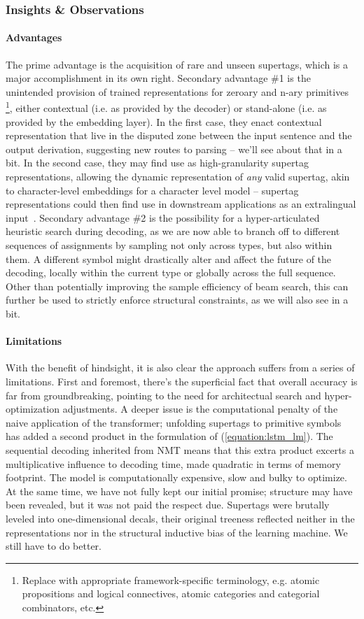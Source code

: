 \subsubsection{Insights \& Observations}
\paragraph{Advantages}
The prime advantage is the acquisition of rare and unseen supertags, which is a major accomplishment in its own right.
Secondary advantage \#1 is the unintended provision of trained representations for zeroary and n-ary primitives%
	\footnote{Replace with appropriate framework-specific terminology, e.g. atomic propositions and logical connectives, atomic categories and categorial combinators, etc.},
either contextual (i.e. as provided by the decoder) or stand-alone (i.e. as provided by the embedding layer).
In the first case, they enact contextual representation that live in the disputed zone between the input sentence and the output derivation, suggesting new routes to parsing -- we'll see about that in a bit.
In the second case, they may find use as high-granularity supertag representations, allowing the dynamic representation of \textit{any} valid supertag, akin to character-level embeddings for a character level model -- supertag representations could then find use in downstream applications as an extralingual input~\cite{kasai-etal-2017-tag}.
Secondary advantage \#2 is the possibility for a hyper-articulated heuristic search during decoding, as we are now able to branch off to different sequences of assignments by sampling not only across types, but also within them.
A different symbol might drastically alter and affect the future of the decoding, locally within the current type or globally across the full sequence.
Other than potentially improving the sample efficiency of beam search, this can further be used to strictly enforce structural constraints, as we will also see in a bit.

\paragraph{Limitations}
With the benefit of hindsight, it is also clear the approach suffers from a series of limitations.
First and foremost, there's the superficial fact that overall accuracy is far from groundbreaking, pointing to the need for architectual search and hyper-optimization adjustments.
A deeper issue is the computational penalty of the naive application of the transformer; unfolding supertags to primitive symbols has added a second product in the formulation of (\ref{equation:lstm_lm}).
The sequential decoding inherited from NMT means that this extra product excerts a multiplicative influence to decoding time, made quadratic in terms of memory footprint.
The model is computationally expensive, slow and bulky to optimize.
At the same time, we have not fully kept our initial promise; structure may have been revealed, but it was not paid the respect due.
Supertags were brutally leveled into one-dimensional decals, their original treeness reflected neither in the representations nor in the structural inductive bias of the learning machine.
We still have to do better.

